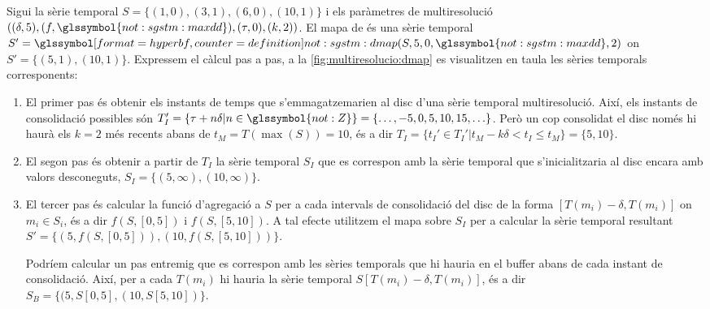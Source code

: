 \begin{example}
  \label{ex:multiresolucio:dmap}
  Sigui la sèrie temporal $S=\{(1,0),(3,1),(6,0),(10,1)\}$ i els
  paràmetres de multiresolució
  $((\delta,5),(f,\glssymbol{not:sgstm:maxdd}),(\tau,0),(k,2))$.  El
  mapa de  és una sèrie temporal $S'=
  \glssymboldef{not:sgstm:dmap}(S,5,0,\glssymbol{not:sgstm:maxdd},2)$
  on $S'=\{(5,1),(10,1)\}$. Expressem el càlcul pas a pas, a la
  \autoref{fig:multiresolucio:dmap} es visualitzen en taula les sèries
  temporals corresponents:
  \begin{enumerate}
  \item El primer pas és obtenir els instants de temps que
    s'emmagatzemarien al disc d'una sèrie temporal
    multiresolució. Així, els instants de consolidació possibles són
    $T_I'=\{\tau+n\delta|n\in\glssymbol{not:Z}\}=
    \{\ldots,-5,0,5,10,15,\ldots\}$. Però un cop consolidat el disc
    només hi haurà els $k=2$ més recents abans de $t_M=T(\max(S))=10$,
    és a dir $T_I=\{t_I'\in T_I'|t_M - k\delta < t_I \leq
    t_M\}=\{5,10\}$.

  \item El segon pas és obtenir a partir de $T_I$ la sèrie temporal
    $S_I$ que es correspon amb la sèrie temporal que s'inicialitzaria
    al disc encara amb valors desconeguts,
    $S_I=\{(5,\infty),(10,\infty)\}$.



  \item El tercer pas és calcular la funció d'agregació a $S$ per a
    cada intervals de consolidació del disc de la forma
    $[T(m_i)-\delta,T(m_i)]$ on $m_i\in S_i$, és a dir $f(S,[0,5])$ i
    $f(S,[5,10])$. A tal efecte utilitzem el mapa sobre $S_I$ per a
    calcular la sèrie temporal resultant $S'=\{ (5,f(S,[0,5])),
    (10,f(S,[5,10])) \}$.

    Podríem calcular un pas entremig que es correspon amb les sèries
    temporals que hi hauria en el buffer abans de cada instant de
    consolidació. Així, per a cada $T(m_i)$ hi hauria la sèrie
    temporal $S[T(m_i)-\delta,T(m_i)]$, és a dir $S_B=\{
    (5,S[0,5],(10,S[5,10]) \}$.
  \end{enumerate}


  



\end{example}
